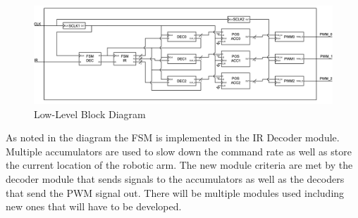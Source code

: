 \documentclass[
    a4paper, %
	12pt, %
    ]{CSSullivanBusinessReport}
\begin{document}
\begin{fullwidth} %
    \begin{figure}
        \centering
        \includegraphics[width=.8\pdfpagewidth]{Pictures/High Level Diagram V2.png}
        \caption{Low-Level Block Diagram}
        \label{fig:lowlevelblockdiagram}
    \end{figure}
	As noted in the diagram the FSM is implemented in the IR Decoder module. Multiple accumulators are used to slow down the command rate as well as store the current location of the robotic arm. The new module criteria are met by the decoder module that sends signals to the accumulators as well as the decoders that send the PWM signal out. There will be multiple modules used including new ones that will have to be developed.
\end{fullwidth}



\end{document}
